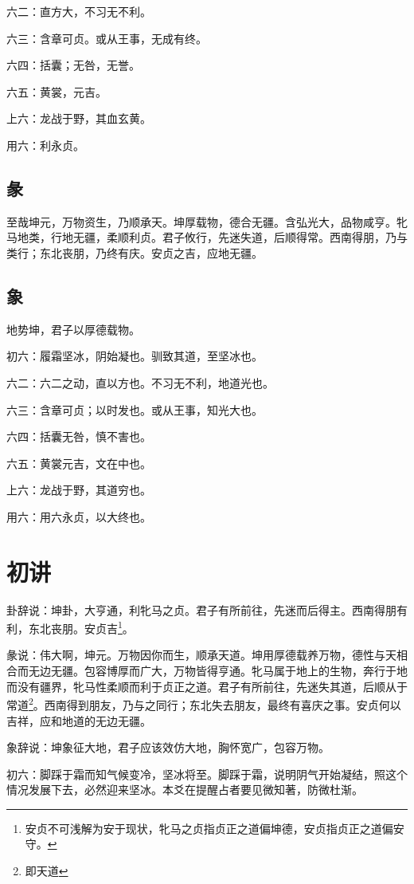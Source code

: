 \documentclass[12pt,oneside]{book}
\begin{document}
六二：直方大，不习无不利。

六三：含章可贞。或从王事，无成有终。

六四：括囊；无咎，无誉。

六五：黄裳，元吉。

上六：龙战于野，其血玄黄。

用六：利永贞。

\subsection{彖}
至哉坤元，万物资生，乃顺承天。坤厚载物，德合无疆。含弘光大，品物咸亨。牝马地类，行地无疆，柔顺利贞。君子攸行，先迷失道，后顺得常。西南得朋，乃与类行；东北丧朋，乃终有庆。安贞之吉，应地无疆。

\subsection{象}
地势坤，君子以厚德载物。

初六：履霜坚冰，阴始凝也。驯致其道，至坚冰也。

六二：六二之动，直以方也。不习无不利，地道光也。

六三：含章可贞；以时发也。或从王事，知光大也。

六四：括囊无咎，慎不害也。

六五：黄裳元吉，文在中也。

上六：龙战于野，其道穷也。

用六：用六永贞，以大终也。

\section{初讲}
卦辞说：坤卦，大亨通，利牝马之贞。君子有所前往，先迷而后得主。西南得朋有利，东北丧朋。安贞吉\footnote{安贞不可浅解为安于现状，牝马之贞指贞正之道偏坤德，安贞指贞正之道偏安守。}。

彖说：伟大啊，坤元。万物因你而生，顺承天道。坤用厚德载养万物，德性与天相合而无边无疆。包容博厚而广大，万物皆得亨通。牝马属于地上的生物，奔行于地而没有疆界，牝马性柔顺而利于贞正之道。君子有所前往，先迷失其道，后顺从于常道\footnote{即天道}。西南得到朋友，乃与之同行；东北失去朋友，最终有喜庆之事。安贞何以吉祥，应和地道的无边无疆。

象辞说：坤象征大地，君子应该效仿大地，胸怀宽广，包容万物。


初六：脚踩于霜而知气候变冷，坚冰将至。脚踩于霜，说明阴气开始凝结，照这个情况发展下去，必然迎来坚冰。本爻在提醒占者要见微知著，防微杜渐。
\end{document}
